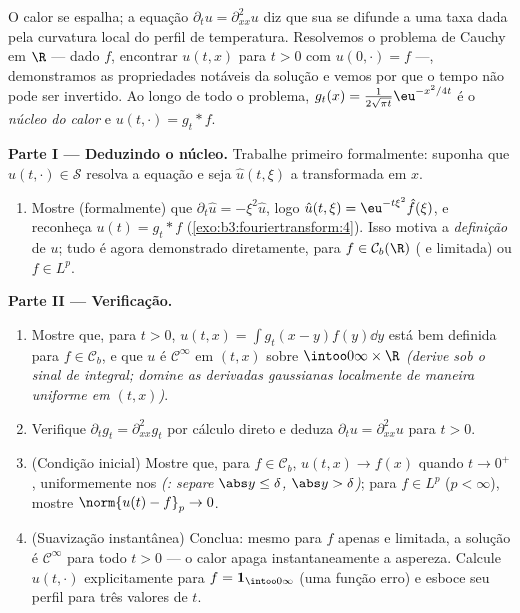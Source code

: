 \begin{problem}[{Problema de fim de semana --- $\partial_tu =
\partial^2_{xx}u$, resolvida de
ponta a ponta}]
\label{pb:b3:fouriertransform:1}
O calor se espalha; a equação $\partial_tu = \partial_{xx}^2u$ diz que sua  se difunde a
uma taxa dada pela curvatura local do perfil de temperatura. Resolvemos
o problema de Cauchy em $\R$ --- dado $f$, encontrar $u(t, x)$ para
$t > 0$ com $u(0, \cdot) = f$ ---, demonstramos as propriedades notáveis da
solução e vemos por que o tempo não pode ser invertido. Ao longo de todo
o problema, $g_t(x) = \frac1{2\sqrt{\pi t}}\eu^{-x^2/4t}$ é o \emph{núcleo do calor} e
$u(t, \cdot) = g_t *
f$.

\medskip
\noindent\textbf{Parte I --- Deduzindo o núcleo.} Trabalhe primeiro
formalmente: suponha que $u(t, \cdot) \in \mathcal S$ resolva a equação e seja $\hat u(t, \xi)$ a
transformada em $x$.
\begin{enumerate}
  \item Mostre (formalmente) que $\partial_t\hat u = -\xi^2\hat u$, logo $\hat u(t,\xi) = \eu^{-t\xi^2}\hat f(\xi)$, e reconheça $u(t) = g_t * f$
        (\cref{exo:b3:fouriertransform:4}). Isso motiva a \emph{definição} de $u$;
        tudo é agora demonstrado diretamente, para $f \in \mathcal C_b(\R)$ ( e
        limitada) ou $f \in L^p$.
\end{enumerate}

\medskip
\noindent\textbf{Parte II --- Verificação.}
\begin{enumerate}[resume]
  \item Mostre que, para $t > 0$, $u(t, x) = \int
        g_t(x-y)f(y)\dd y$ está bem definida para $f \in \mathcal
        C_b$,
        e que $u$ é $\mathcal C^\infty$ em $(t, x)$ sobre $\intoo0\infty\times\R$ \emph{(derive
        sob o sinal de integral; domine as derivadas gaussianas
        localmente de maneira uniforme em $(t,x)$)}.
  \item Verifique $\partial_tg_t = \partial^2_{xx}g_t$ por cálculo direto e deduza $\partial_tu =
        \partial^2_{xx}u$ para
        $t > 0$.
  \item (Condição inicial) Mostre que, para $f \in \mathcal
        C_b$, $u(t, x) \to f(x)$ quando $t \to 0^+$,
        uniformemente nos  \emph{(:
        separe $\abs y
        \leq \delta$, $\abs y > \delta$)}; para $f \in L^p$ ($p < \infty$), mostre $\norm{u(t) - f}_p \to 0$.
  \item (Suavização instantânea) Conclua: mesmo para $f$ apenas
         e limitada, a solução é $\mathcal C^\infty$ para todo $t > 0$ ---
        o calor apaga instantaneamente a aspereza. Calcule $u(t, \cdot)$
        explicitamente para $f =
        \mathbf 1_{\intoo0\infty}$ (uma função erro) e esboce seu perfil
        para três valores de $t$.
\end{enumerate}


\end{problem}
